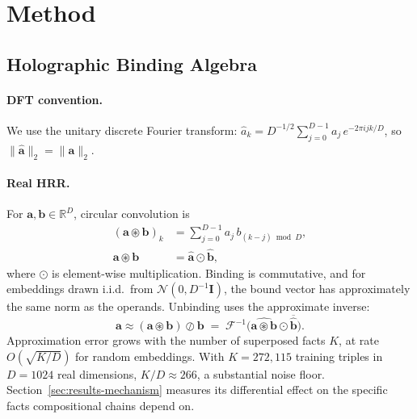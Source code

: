 \documentclass[11pt]{article}
\theoremstyle{definition}
\newcommand{\bind}{\circledast}
\newcommand{\unbind}{\oslash}
\newcommand{\Rb}{\mathbb{R}}
\begin{document}
\section{Method}
\label{sec:method}

\subsection{Holographic Binding Algebra}
\label{sec:method-algebra}

\paragraph{DFT convention.}
We use the unitary discrete Fourier transform:
$\hat{a}_k = D^{-1/2}\sum_{j=0}^{D-1} a_j\, e^{-2\pi i jk/D}$,
so $\|\hat{\mathbf{a}}\|_2 = \|\mathbf{a}\|_2$.

\paragraph{Real HRR.}
For $\mathbf{a}, \mathbf{b} \in \Rb^D$, circular convolution is
\begin{align}
  (\mathbf{a} \bind \mathbf{b})_k 
    &= \sum_{j=0}^{D-1} a_j\, b_{(k-j) \bmod D},
  \label{eq:cconv}\\
  \widehat{\mathbf{a} \bind \mathbf{b}} 
    &= \hat{\mathbf{a}} \odot \hat{\mathbf{b}},
  \label{eq:cconv-freq}
\end{align}
where $\odot$ is element-wise multiplication. Binding is commutative, and for
embeddings drawn i.i.d.\ from $\mathcal{N}(0, D^{-1}\mathbf{I})$, the bound
vector has approximately the same norm as the operands. Unbinding uses the
approximate inverse:
\begin{equation}
  \mathbf{a} \approx (\mathbf{a} \bind \mathbf{b}) \unbind \mathbf{b}
    \;=\; \mathcal{F}^{-1}\!\bigl(
      \widehat{\mathbf{a} \bind \mathbf{b}} \odot \overline{\hat{\mathbf{b}}}
    \bigr).
  \label{eq:unbind}
\end{equation}
Approximation error grows with the number of superposed facts $K$, at rate
$O(\sqrt{K/D})$ for random embeddings. With $K = 272{,}115$ training triples
in $D = 1024$ real dimensions, $K/D \approx 266$, a substantial noise floor.
Section~\ref{sec:results-mechanism} measures its differential effect on the
specific facts compositional chains depend on.
\end{document}
